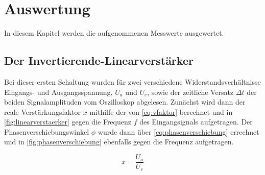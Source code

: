 


\section{Auswertung}
\label{sec:auswertung}

In diesem Kapitel werden die aufgenommenen Messwerte ausgewertet.
\subsection{Der Invertierende-Linearverstärker}
\label{sec:linearverstaerker}
Bei dieser ersten Schaltung wurden für zwei verschiedene Widerstandsverhältnisse Eingangs- und Ausgangsspannung,
$U_a$ und $U_e$, sowie der zeitliche Versatz $\Delta t$ der beiden Signalamplituden vom Oszilloskop abgelesen. 
Zunächst wird dann der reale Verstärkungsfaktor $x$ mithilfe der von \autoref{eq:vfaktor} berechnet und in 
\autoref{fig:linearverstaerker} gegen die Frequenz $f$ des Eingangsignals aufgetragen. Der Phasenverschiebungswinkel
$\phi$ wurde dann über \autoref{eq:phasenverschiebung} errechnet und in \autoref{fig:phasenverschiebung} 
ebenfalls gegen die Frequenz aufgetragen.

\begin{equation}
    \label{eq:vfaktor}
    x=\frac{U_a}{U_e}
\end{equation}

